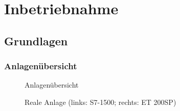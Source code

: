 \section{Inbetriebnahme}

\subsection{Grundlagen}

\subsubsection{Anlagenübersicht}

\begin{figure}[H]
   \centering
   \caption[Anlagenübersicht]{Anlagenübersicht}
   \label{fig:Bild1.1}
\end{figure}

\begin{figure}[H]
   \centering
   \caption[Reale Anlage]{Reale Anlage (links: S7-1500; rechts: ET 200SP)}
   \label{fig:Bild1.2}
\end{figure}

